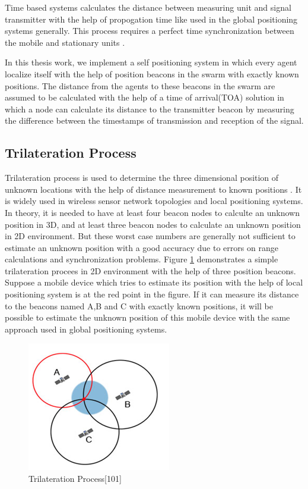 Time based systems calculates the distance between measuring unit and signal transmitter with the help of propogation time like used in the global positioning systems generally. This process requires a perfect time synchronization between the mobile and stationary units \cite{20}.

In this thesis work, we implement a self positioning system in which every agent localize itself with the help of position beacons in the swarm with exactly known positions. The distance from the agents to these beacons in the swarm are assumed to be calculated with the help of a time of arrival(TOA) solution in which a node can calculate its distance to the transmitter beacon by measuring the difference between the timestamps of transmission and reception of the signal. 


\subsection{Trilateration Process} \label{Trilateration_Process_ref}

Trilateration process is used to determine the three dimensional position of unknown locations with the help of distance measurement to known positions \cite{22}.  It is widely used in wireless sensor network topologies and local positioning systems.  In theory, it is needed to have at least four beacon nodes to calculte an unknown position in 3D, and at least three beacon nodes to calculate an unknown position in 2D environment. But these worst case numbers are generally not sufficient to estimate an unknown position with a good accuracy due to errors on range calculations and synchronization problems. Figure \ref{trilateration_ref} demonstrates a simple trilateration procees in 2D environment with the help of  three position beacons. Suppose a mobile device which tries to estimate its position with the help of local positioning system is at the red point in the figure. If it can measure its distance to the beacons named A,B and C with exactly known positions, it will be possible to estimate the unknown position of this mobile device with the same approach used in global positioning systems. 


\begin{figure}[H]
	\caption{Trilateration Process[101]} \label{trilateration_ref}
	\centering
	\includegraphics[scale = 1]{trilateration}
\end{figure}



